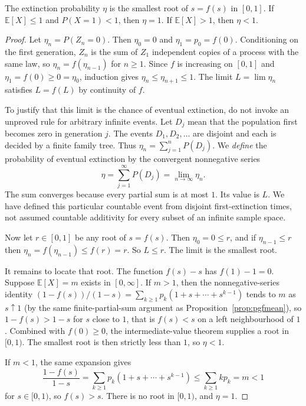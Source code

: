 \begin{theorem}[extinction]\label{thm:extinction}
The extinction probability $\eta$ is the smallest root of $s=f(s)$ in $[0,1]$. If $\mathbb E[X]\le1$ and $P(X=1)<1$, then $\eta=1$. If $\mathbb E[X]>1$, then $\eta<1$.
\end{theorem}
\begin{proof}
Let $\eta_n=P(Z_n=0)$. Then $\eta_0=0$ and $\eta_1=p_0=f(0)$. Conditioning on the first generation, $Z_n$ is the sum of $Z_1$ independent copies of a process with the same law, so $\eta_{n}=f(\eta_{n-1})$ for $n\ge1$. Since $f$ is increasing on $[0,1]$ and $\eta_1=f(0)\ge0=\eta_0$, induction gives $\eta_n\le\eta_{n+1}\le1$. The limit $L=\lim\eta_n$ satisfies $L=f(L)$ by continuity of $f$.

To justify that this limit is the chance of eventual extinction, do not invoke an unproved rule for arbitrary infinite events. Let $D_j$ mean that the population first becomes zero in generation $j$. The events $D_1,D_2,\ldots$ are disjoint and each is decided by a finite family tree. Thus $\eta_n=\sum_{j=1}^nP(D_j)$. We \emph{define} the probability of eventual extinction by the convergent nonnegative series
\[
 \eta=\sum_{j=1}^{\infty}P(D_j)=\lim_{n\to\infty}\eta_n.
\]
The sum converges because every partial sum is at most $1$. Its value is $L$. We have defined this particular countable event from disjoint first-extinction times, not assumed countable additivity for every subset of an infinite sample space.

Now let $r\in[0,1]$ be any root of $s=f(s)$. Then $\eta_0=0\le r$, and if $\eta_{n-1}\le r$ then $\eta_n=f(\eta_{n-1})\le f(r)=r$. So $L\le r$. The limit is the smallest root.

It remains to locate that root. The function $f(s)-s$ has $f(1)-1=0$. Suppose $\mathbb E[X]=m$ exists in $[0,\infty]$. If $m>1$, then the nonnegative-series identity $(1-f(s))/(1-s)=\sum_{k\ge1}p_k(1+s+\cdots+s^{k-1})$ tends to $m$ as $s\uparrow1$ (by the same finite-partial-sum argument as Proposition~\ref{prop:pgfmean}), so $1-f(s)>1-s$ for $s$ close to $1$, that is $f(s)<s$ on a left neighbourhood of $1$. Combined with $f(0)\ge0$, the intermediate-value theorem supplies a root in $[0,1)$. The smallest root is then strictly less than $1$, so $\eta<1$.

If $m<1$, the same expansion gives
\[
 \frac{1-f(s)}{1-s}=\sum_{k\ge1}p_k(1+s+\cdots+s^{k-1})\le\sum_{k\ge1}kp_k=m<1
\]
for $s\in[0,1)$, so $f(s)>s$. There is no root in $[0,1)$, and $\eta=1$.


\end{proof}

